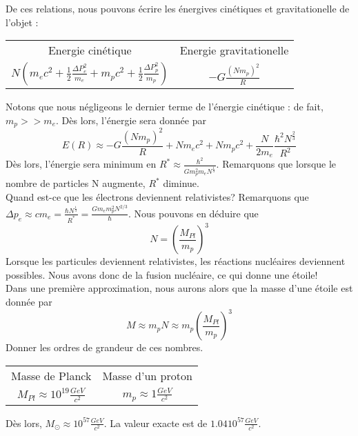 \documentclass[../Notes de cours]{subfiles}
\begin{document}
De ces relations, nous pouvons écrire les énergives cinétiques et gravitationelle de l'objet : 
\begin{center}
\begin{tabular}{c c}
Energie cinétique & Energie gravitationelle\\
$N \left( m_e c^2 + \frac{1}{2} \frac{\Delta P_e^2}{m_e} + m_p c^2 + \frac{1}{2} \frac{\Delta P_p^2}{m_p} \right)$ & $- G \frac{(Nm_p)^2}{R}$
\end{tabular}
\end{center}
Notons que nous négligeons le dernier terme de l'énergie cinétique : de fait, $m_p >> m_e$.
Dès lors, l'énergie sera donnée par 
\begin{equation}
E(R) \approx - G \frac{(Nm_p)^2}{R} + Nm_e c^2 + Nm_p c^2 + \frac{N}{2m_e} \frac{\hbar^2 N^{\frac{2}{3}}}{R^2}
\end{equation}
Dès lors, l'énergie sera minimum en $R^* \approx \frac{\hbar^2}{Gm_p^2m_eN^{\frac{1}{3}}}$. Remarquons que lorsque le nombre de particles N augmente, $R^*$ diminue.\\

Quand est-ce que les électrons deviennent relativistes? Remarquons que $\Delta p_e \approx cm_e = \frac{\hbar N^{\frac{1}{3}}}{R^*} = \frac{Gm_em_p^2N^{2/3}}{\hbar}$. Nous pouvons en déduire que 
\begin{equation}
N = \left( \frac{M_{Pl}}{m_p} \right)^3
\end{equation}
Lorsque les particules deviennent relativistes, les réactions nucléaires deviennent possibles. Nous avons donc de la fusion nucléaire, ce qui donne une étoile!\\

Dans une première approximation, nous aurons alors que la masse d'une étoile est donnée par 
\begin{equation}
M \approx m_p N \approx m_p \left( \frac{M_{Pl}}{m_p} \right)^3
\end{equation}
Donner les ordres de grandeur de ces nombres.
\begin{center}
\begin{tabular}{c c}
Masse de Planck & Masse d'un proton\\
$M_{Pl} \approx 10^{19} \frac{GeV}{c^2}$ & $m_p \approx 1 \frac{GeV}{c^2}$
\end{tabular}
\end{center}
Dès lors, $ M_\odot \approx 10^{57} \frac{GeV}{c^2}$. La valeur exacte est de $1.04 10^{57} \frac{GeV}{c^2}$.\\
\end{document}
